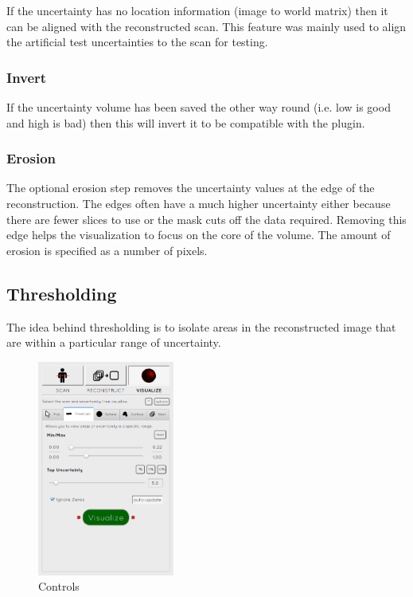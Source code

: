 If the uncertainty has no location information (image to world matrix) then it can be aligned with the reconstructed scan. This feature was mainly used to align the artificial test uncertainties to the scan for testing.

\subsubsection*{Invert}
If the uncertainty volume has been saved the other way round (i.e. low is good and high is bad) then this will invert it to be compatible with the plugin.

\subsubsection*{Erosion}
The optional erosion step removes the uncertainty values at the edge of the reconstruction. The edges often have a much higher uncertainty either because there are fewer slices to use or the mask cuts off the data required. Removing this edge helps the visualization to focus on the core of the volume. The amount of erosion is specified as a number of pixels.

\clearpage
\subsection{Thresholding}\label{implementation:thresholding}
The idea behind thresholding is to isolate areas in the reconstructed image that are within a particular range of uncertainty. 

\begin{figure}
  \vspace{-20pt}
  \includegraphics[width=0.4\textwidth]{images/tool/2_thresholding.png}
  \caption{Controls}\label{fig:threshold_settings}
\end{figure}

